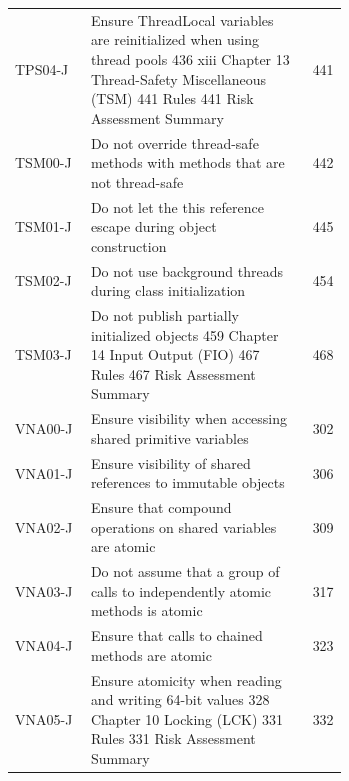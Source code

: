 \documentclass[11pt]{report}
\begin{document}
\begin{longtable}{@{}l>{\raggedright\arraybackslash}p{0.66\linewidth}r@{}}
TPS04-J & Ensure ThreadLocal variables are reinitialized when using thread pools 436 xiii Chapter 13 Thread-Safety Miscellaneous (TSM) 441 Rules 441 Risk Assessment Summary & 441\\
TSM00-J & Do not override thread-safe methods with methods that are not thread-safe & 442\\
TSM01-J & Do not let the this reference escape during object construction & 445\\
TSM02-J & Do not use background threads during class initialization & 454\\
TSM03-J & Do not publish partially initialized objects 459 Chapter 14 Input Output (FIO) 467 Rules 467 Risk Assessment Summary & 468\\
VNA00-J & Ensure visibility when accessing shared primitive variables & 302\\
VNA01-J & Ensure visibility of shared references to immutable objects & 306\\
VNA02-J & Ensure that compound operations on shared variables are atomic & 309\\
VNA03-J & Do not assume that a group of calls to independently atomic methods is atomic & 317\\
VNA04-J & Ensure that calls to chained methods are atomic & 323\\
VNA05-J & Ensure atomicity when reading and writing 64-bit values 328 Chapter 10 Locking (LCK) 331 Rules 331 Risk Assessment Summary & 332\\
\end{longtable}
\end{document}
